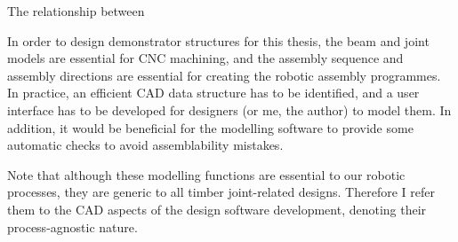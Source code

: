The relationship between 

In order to design demonstrator structures for this thesis, the beam and joint models are essential for CNC machining, and the assembly sequence and assembly directions are essential for creating the robotic assembly programmes. In practice, an efficient CAD data structure has to be identified, and a user interface has to be developed for designers (or me, the author) to model them. In addition, it would be beneficial for the modelling software to provide some automatic checks to avoid assemblability mistakes. 

Note that although these modelling functions are essential to our robotic processes, they are generic to all timber joint-related designs. Therefore I refer them to the CAD aspects of the design software development, denoting their process-agnostic nature.

